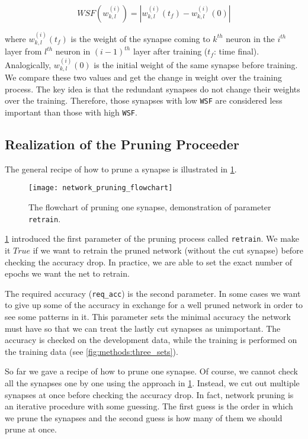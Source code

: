 \begin{equation} \label{eq:weight_significance_factor}
WSF(w_{k,l}^{(i)}) = | w_{k,l}^{(i)} (t_f) - w_{k,l}^{(i)} (0) |
\end{equation}

where $ w_{k,l}^{(i)} (t_f) $ is the weight of the synapse coming to $ k^{th} $ neuron in the $ i^{th} $ layer from $ l^{th} $ neuron in $ (i-1)^{th} $ layer after training ($ t_f $: time final). Analogically, $ w_{k,l}^{(i)} (0) $ is the initial weight of the same synapse before training. We compare these two values and get the change in weight over the training process. The key idea is that the redundant synapses do not change their weights over the training. Therefore, those synapses with low \texttt{WSF} are considered less important than those with high \texttt{WSF}.

\subsection*{Realization of the Pruning Proceeder}
The general recipe of how to prune a synapse is illustrated in \cref{fig:methods:network_pruning_flowchart}.

\begin{figure}[H]
  \centering
  \texttt{[image: network\_pruning\_flowchart]}
  \caption{The flowchart of pruning one synapse, demonstration of parameter \texttt{retrain}.}
  \label{fig:methods:network_pruning_flowchart}
\end{figure}

\cref{fig:methods:network_pruning_flowchart} introduced the first parameter of the pruning process called \texttt{retrain}. We make it $ True $ if we want to retrain the pruned network (without the cut synapse) before checking the accuracy drop. In practice, we are able to set the exact number of epochs we want the net to retrain.

The required accuracy (\texttt{req\_acc}) is the second parameter. In some cases we want to give up some of the accuracy in exchange for a well pruned network in order to see some patterns in it. This parameter sets the minimal accuracy the network must have so that we can treat the lastly cut synapses as unimportant. The accuracy is checked on the development data, while the training is performed on the training data (see \cref{fig:methods:three_sets}).

So far we gave a recipe of how to prune one synapse. Of course, we cannot check all the synapses one by one using the approach in \cref{fig:methods:network_pruning_flowchart}. Instead, we cut out multiple synapses at once before checking the accuracy drop. In fact, network pruning is an iterative procedure with some guessing. The first guess is the order in which we prune the synapses and the second guess is how many of them we should prune at once.

